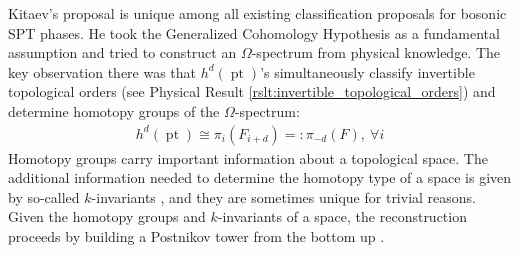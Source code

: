\documentclass[sort&compress]{elsarticle}
\theoremstyle{theoremstyle}
\theoremstyle{framedtheoremstyle}
\theoremstyle{definitionstyle}
\theoremstyle{definitionstyle}
\theoremstyle{definitionstyle}
\theoremstyle{definitionstyle}
\theoremstyle{nameddefinitionstyle}
\theoremstyle{framednameddefinitionstyle}
\theoremstyle{proofstyle}
\theoremstyle{definitionstyle}
\newcommand{\eqcolon}{=\mathrel{\mathop:}}
\newcommand{\isomorphic}{\cong}
\newcommand{\paren}[1]{\left( #1 \right)}
\DeclareMathOperator{\pt}{pt}
\begin{document}
\begin{appendices}
Kitaev's proposal \cite{Kitaev_Stony_Brook_2011_SRE_1, Kitaev_Stony_Brook_2013_SRE} is unique among all existing classification proposals for bosonic SPT phases.
He took the Generalized Cohomology Hypothesis as a fundamental assumption and tried to construct an $\Omega$-spectrum from physical knowledge.
The key observation there was that $h^d\paren{\pt}$'s simultaneously classify invertible topological orders (see Physical Result \ref{rslt:invertible_topological_orders}) and determine homotopy groups of the $\Omega$-spectrum:
\begin{eqnarray}
h^d\paren{\pt} \isomorphic \pi_i \paren{F_{i+d}} \eqcolon \pi_{-d}\paren{F}, ~\forall i
\end{eqnarray}
Homotopy groups carry important information about a topological space. The additional information needed to determine the homotopy type of a space is given by so-called $k$-invariants \cite{Hatcher}, and they are sometimes unique for trivial reasons.
Given the homotopy groups and $k$-invariants of a space, the reconstruction proceeds by building a Postnikov tower from the bottom up \cite{Hatcher}.


\end{appendices}
\end{document}
